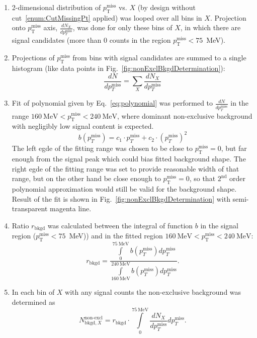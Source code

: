 \begin{enumerate}
 \item 2-dimensional distribution of $p_{\text{T}}^{\text{miss}}$ vs. $X$ (by design without cut~\ref{enum:CutMissingPt} applied) was looped over all bins in $X$. Projection onto $p_{\text{T}}^{\text{miss}}$ axis, $\frac{dN_{X}}{dp_{T}^{\text{miss}}}$, was done for only these bins of $X$, in which there are signal candidates (more than 0 counts in the region $p_{\text{T}}^{\text{miss}}<75$~MeV).
 \item Projections of $p_{\text{T}}^{\text{miss}}$ from bins with signal candidates are summed to a single histogram (like data points in Fig.~\ref{fig:nonExclBkgdDetermination}):
 \begin{equation}
  \frac{dN}{dp_{T}^{\text{miss}}} = \sum_{X}\frac{dN_{X}}{dp_{T}^{\text{miss}}}
 \end{equation}

 \item Fit of polynomial given by Eq.~\eqref{eq:polynomial} was performed to $\frac{dN}{dp_{T}^{\text{miss}}}$ in the range $160~\text{MeV}<p_{\text{T}}^{\text{miss}}<240~\text{MeV}$, where dominant non-exclusive background with negligibly low signal content is expected.
 \begin{equation}\label{eq:polynomial}
 b\left(p_{T}^{\text{miss}}\right) = c_{1}\cdot p_{T}^{\text{miss}} + c_{2}\cdot\left(p_{T}^{\text{miss}}\right)^2
\end{equation}
The left egde of the fitting range was chosen to be close to $p_{\text{T}}^{\text{miss}}=0$, but far enough from the signal peak which could bias fitted background shape. The right egde of the fitting range was set to provide reasonable width of that range, but on the other hand be close enough to $p_{\text{T}}^{\text{miss}}=0$, so that $2^{\text{nd}}$ order polynomial approximation would still be valid for the background shape. Result of the fit is shown in Fig.~\ref{fig:nonExclBkgdDetermination} with semi-transparent magenta line.
\item Ratio $r_{\text{bkgd}}$ was calculated between the integral of function $b$ in the signal region ($p_{\text{T}}^{\text{miss}}<75$~MeV)) and in the fitted region $160~\text{MeV}<p_{\text{T}}^{\text{miss}}<240~\text{MeV}$:
\begin{equation}\label{eq:r_bkgd}
 r_{\text{bkgd}} = \frac{\int\limits_{0}^{75~\text{MeV}} b\left(p_{T}^{\text{miss}}\right) dp_{T}^{\text{miss}}}{\int\limits_{160~\text{MeV}}^{240~\text{MeV}} b\left(p_{T}^{\text{miss}}\right) dp_{T}^{\text{miss}}}.
\end{equation}
\item In each bin of $X$ with any signal counts the non-exclusive background was determined as
\begin{equation}\label{eq:nonExclBkgd}
 N_{\text{bkgd},X}^{\text{non-excl}} = r_{\text{bkgd}} \cdot \int\limits_{0}^{75~\text{MeV}} \frac{dN_{X}}{dp_{T}^{\text{miss}}} dp_{T}^{\text{miss}}.
\end{equation}
\end{enumerate}

